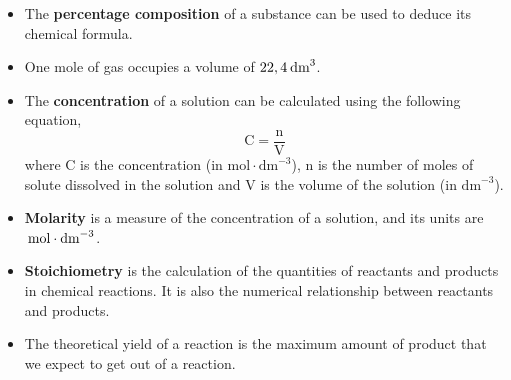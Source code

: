 \begin{itemize}[noitemsep]
\label{m38712*uid116}\item The \textbf{percentage composition} of a substance can be used to deduce its chemical formula.
\label{m38712*uid117}\item One mole of gas occupies a volume of $22,4\phantom{\rule{2pt}{0ex}}{\text{dm}}^{3}$.
\label{m38712*uid118}\item The \textbf{concentration} of a solution can be calculated using the following equation,
\label{m38712*id286019}\nopagebreak\noindent{}
    \begin{equation*}
    \text{C}=\frac{\text{n}}{\text{V}}
      \end{equation*}
where C is the concentration (in $\text{mol}\ensuremath{\cdot}{\text{dm}}^{-3}$), n is the number of moles of solute dissolved in the solution and V is the volume of the solution (in ${\text{dm}}^{-3}$).
\label{m38712*uid119}\item \textbf{Molarity} is a measure of the concentration of a solution, and its units are $\phantom{\rule{2pt}{0ex}}\text{mol}\ensuremath{\cdot}{\text{dm}}^{-3}$.
\label{m38712*uid120}\item \textbf{Stoichiometry} is the calculation of the quantities of reactants and products in chemical reactions. It is also the numerical relationship between reactants and products.
\item The theoretical yield of a reaction is the maximum amount of product that we expect to get out of a reaction.\end{itemize}
\label{m38712*secfhsst!!!underscore!!!id2334}
